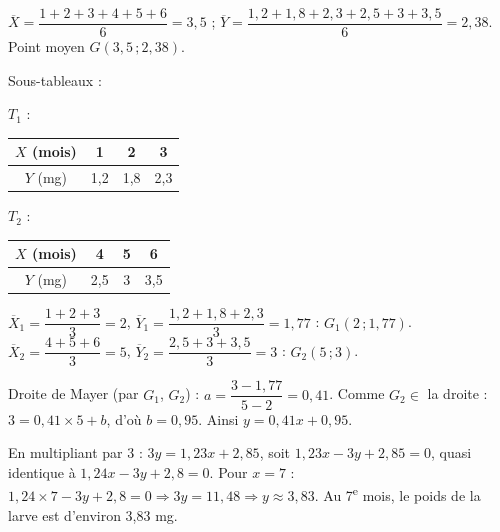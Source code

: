 \documentclass[11pt]{article}
\begin{document}
\begin{questions}
\begin{sousq}
\begin{center}
    \end{center}
  \end{sousq}
\end{questions}

\begin{questions}
  \item $\overline{X} = \dfrac{1+2+3+4+5+6}{6} = 3{,}5$ ; $\overline{Y} = \dfrac{1{,}2 + 1{,}8 + 2{,}3 + 2{,}5 + 3 + 3{,}5}{6} = 2{,}38$. Point moyen $G(3{,}5\,;2{,}38)$.
  \item \begin{sousq}
    \item Sous-tableaux :
    \begin{center}\renewcommand{\arraystretch}{1.3}
    $T_1$ : \begin{tabular}{|c|c|c|c|}\hline $X$ (mois) & 1 & 2 & 3 \\\hline $Y$ (mg) & 1{,}2 & 1{,}8 & 2{,}3 \\\hline\end{tabular}\qquad
    $T_2$ : \begin{tabular}{|c|c|c|c|}\hline $X$ (mois) & 4 & 5 & 6 \\\hline $Y$ (mg) & 2{,}5 & 3 & 3{,}5 \\\hline\end{tabular}
    \end{center}
    \item $\overline{X}_1 = \dfrac{1+2+3}{3} = 2$, $\overline{Y}_1 = \dfrac{1{,}2 + 1{,}8 + 2{,}3}{3} = 1{,}77$ : $G_1(2\,;1{,}77)$. $\overline{X}_2 = \dfrac{4+5+6}{3} = 5$, $\overline{Y}_2 = \dfrac{2{,}5 + 3 + 3{,}5}{3} = 3$ : $G_2(5\,;3)$.
    \item Droite de Mayer (par $G_1$, $G_2$) : $a = \dfrac{3 - 1{,}77}{5 - 2} = 0{,}41$. Comme $G_2 \in$ la droite : $3 = 0{,}41\times 5 + b$, d'où $b = 0{,}95$. Ainsi $y = 0{,}41x + 0{,}95$.
  \end{sousq}
  \item En multipliant par 3 : $3y = 1{,}23x + 2{,}85$, soit $1{,}23x - 3y + 2{,}85 = 0$, quasi identique à $1{,}24x - 3y + 2{,}8 = 0$. Pour $x = 7$ : $1{,}24\times 7 - 3y + 2{,}8 = 0 \Rightarrow 3y = 11{,}48 \Rightarrow y \approx 3{,}83$. Au 7\textsuperscript{e} mois, le poids de la larve est d'environ 3,83 mg.
\end{questions}
\end{document}
